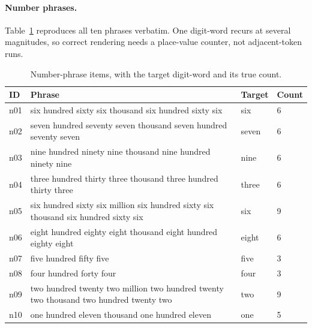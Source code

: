 \paragraph{Number phrases.} Table~\ref{tab:numbers} reproduces all ten
phrases verbatim. One digit-word recurs at several magnitudes, so correct
rendering needs a place-value counter, not adjacent-token runs.
\begin{table}[p]
\centering
\caption{Number-phrase items, with the target digit-word and its true count.}
\label{tab:numbers}
\small
\begin{tabular}{@{}lp{12.3cm}ll@{}}
\toprule
ID & Phrase & Target & Count \\
\midrule
n01 & six hundred sixty six thousand six hundred sixty six & six & 6 \\
n02 & seven hundred seventy seven thousand seven hundred seventy seven & seven & 6 \\
n03 & nine hundred ninety nine thousand nine hundred ninety nine & nine & 6 \\
n04 & three hundred thirty three thousand three hundred thirty three & three & 6 \\
n05 & six hundred sixty six million six hundred sixty six thousand six hundred sixty six & six & 9 \\
n06 & eight hundred eighty eight thousand eight hundred eighty eight & eight & 6 \\
n07 & five hundred fifty five & five & 3 \\
n08 & four hundred forty four & four & 3 \\
n09 & two hundred twenty two million two hundred twenty two thousand two hundred twenty two & two & 9 \\
n10 & one hundred eleven thousand one hundred eleven & one & 5 \\
\bottomrule
\end{tabular}
\end{table}

